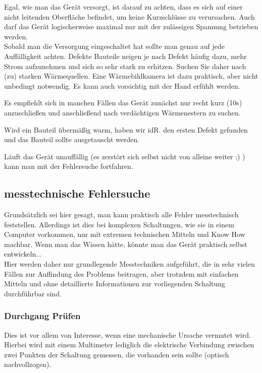 Egal, wie man das Gerät versorgt, ist darauf zu achten, dass es sich auf einer nicht leitenden Oberfläche befindet, um keine Kurzschlüsse zu verursachen.
Auch darf das Gerät logischerweise maximal nur mit der zulässigen Spannung betrieben werden.\\

Sobald man die Versorgung eingeschaltet hat sollte man genau auf jede Auffälligkeit achten.
Defekte Bauteile neigen je nach Defekt häufig dazu, mehr Strom aufzunehmen und sich so sehr stark zu erhitzen. Suchen Sie daher nach (zu) starken Wärmequellen.
Eine Wärmebildkamera ist dazu praktisch, aber nicht unbedingt notwendig.
Es kann auch vorsichtig mit der Hand erfühlt werden.

Es empfiehlt sich in manchen Fällen das Gerät zunächst nur recht kurz (10s) anzuschließen und anschließend nach verdächtigen Wärmenestern zu suchen.

Wird ein Bauteil übermäßig warm, haben wir idR. den ersten Defekt gefunden und das Bauteil sollte ausgetauscht werden.

Läuft das Gerät unauffällig (es zerstört sich selbst nicht von alleine weiter ;) ) kann man mit der Fehlersuche fortfahren.

\subsection{messtechnische Fehlersuche}

Grundsätzlich sei hier gesagt, man kann praktisch alle Fehler messtechnisch feststellen.
Allerdings ist dies bei komplexen Schaltungen, wie sie in einem Computer vorkommen, nur mit extremen technischen Mitteln und Know How machbar. Wenn man das Wissen hätte, könnte man das Gerät praktisch selbst entwickeln...\\

Hier werden daher nur grundlegende Messtechniken aufgeführt, die in sehr vielen Fällen zur Auffindung des Problems beitragen, aber trotzdem mit einfachen Mitteln und ohne detaillierte Informationen zur vorliegenden Schaltung durchführbar sind.

\subsubsection{Durchgang Prüfen}

Dies ist vor allem von Interesse, wenn eine mechanische Ursache vermutet wird.
Hierbei wird mit einem Multimeter lediglich die elektrische Verbindung zwischen zwei Punkten der Schaltung gemessen, die vorhanden sein sollte (optisch nachvollzogen).

